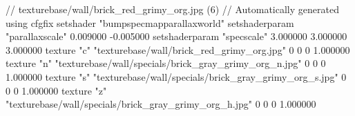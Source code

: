 // texturebase/wall/brick_red_grimy_org.jpg (6)
// Automatically generated using cfgfix
setshader "bumpspecmapparallaxworld"
setshaderparam "parallaxscale" 0.009000 -0.005000
setshaderparam "specscale" 3.000000 3.000000 3.000000
texture "c" "texturebase/wall/brick_red_grimy_org.jpg" 0 0 0 1.000000
texture "n" "texturebase/wall/specials/brick_gray_grimy_org_n.jpg" 0 0 0 1.000000
texture "s" "texturebase/wall/specials/brick_gray_grimy_org_s.jpg" 0 0 0 1.000000
texture "z" "texturebase/wall/specials/brick_gray_grimy_org_h.jpg" 0 0 0 1.000000
